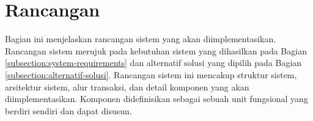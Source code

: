 \section{Rancangan}
\label{sec:rancangan}

Bagian ini menjelaskan rancangan sistem yang akan diimplementasikan. Rancangan sistem merujuk pada kebutuhan sistem yang dihasilkan pada Bagian \ref{subsection:system-requirements} dan alternatif solusi yang dipilih pada Bagian \ref{subsection:alternatif-solusi}. Rancangan sistem ini mencakup struktur sistem, arsitektur sistem, alur transaksi, dan detail komponen yang akan diimplementasikan. Komponen didefinisikan sebagai sebuah unit fungsional yang berdiri sendiri dan dapat disusun.





